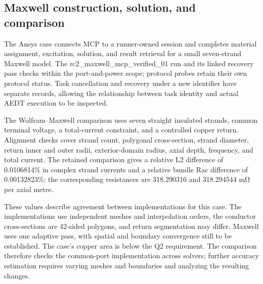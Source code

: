\subsection{Maxwell construction, solution, and comparison}

\hypertarget{auto.04.p3}{}
The Ansys case connects MCP to a runner-owned session and completes material assignment, excitation, solution, and result retrieval for a small seven-strand Maxwell model. The rc2\_maxwell\_mcp\_verified\_01 run and its linked recovery pass checks within the port-and-power scope; protocol probes retain their own protocol status. Task cancellation and recovery under a new identifier have separate records, allowing the relationship between task identity and actual AEDT execution to be inspected.

\hypertarget{auto.04.p4}{}
The Wolfram–Maxwell comparison uses seven straight insulated strands, common terminal voltage, a total-current constraint, and a controlled copper return. Alignment checks cover strand count, polygonal cross-section, strand diameter, return inner and outer radii, exterior-domain radius, axial depth, frequency, and total current. The retained comparison gives a relative L2 difference of 0.0106814\% in complex strand currents and a relative bundle Rac difference of 0.00132823\%; the corresponding resistances are 318.290316 and 318.294544 mΩ per axial metre.

\hypertarget{auto.04.p5}{}
These values describe agreement between implementations for this case. The implementations use independent meshes and interpolation orders, the conductor cross-sections are 42-sided polygons, and return segmentation may differ. Maxwell uses one adaptive pass, with spatial and boundary convergence still to be established. The case's copper area is below the Q2 requirement. The comparison therefore checks the common-port implementation across solvers; further accuracy estimation requires varying meshes and boundaries and analyzing the resulting changes.
